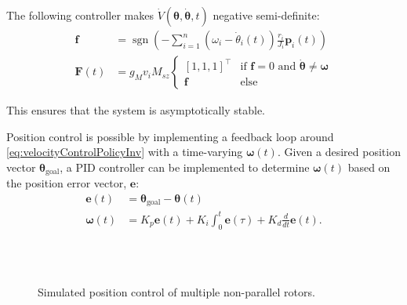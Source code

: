 \documentclass[graybox,usenames]{svmult}
\DeclareMathOperator{\sgn}{sgn}
\begin{document}
The following controller makes $ \dot{V}(\bm{\theta},\dot{\bm{\theta}},t) $ negative semi-definite:
\begin{align}
\mathbf{f} & = \sgn\!\left(  -\sum_{i=1}^n \left(  \omega_i - \dot{\theta}_i(t) \right) \frac{r_i}{J_i}  \mathbf{p}_i(t)    \right)\nonumber\\
\mathbf{F}(t) &=g_{M}v_i M_{sz}\begin{cases} [1,1,1]^\intercal &\mbox{if } \mathbf{f} = 0 \mbox{ and } \dot{\bm{\theta}} \ne \bm{\omega} \\ 
					       \mathbf{f} & \mbox{else } \end{cases}
					       \label{eq:velocityControlPolicyInv}
   \end{align}

This ensures that the system is asymptotically stable.

Position control is possible by implementing a feedback loop around \eqref{eq:velocityControlPolicyInv} with a time-varying $\bm{\omega}(t)$.  Given a desired position vector $\bm{\theta}_{\textrm{goal}}$, a PID controller can be implemented to determine $\bm{\omega}(t)$ based on the position error vector, $\mathbf{e}$:
   \begin{align}
\bm{e}(t) &=\bm{\theta}_{\textrm{goal}} - \bm{\theta}(t)\nonumber \\
\bm{\omega}(t) &= K_{p}  \bm{e}(t) + K_i\int_0^t \bm{e}(\tau) + K_d \frac{d}{dt} \bm{e}(t).
\label{eq:positioncontrol}
   \end{align}

 \begin{figure*}
\vspace{-1.em}\\
\vspace{-1.2em}
\\
\caption{\label{fig:PositionControlSim}Simulated position control of multiple non-parallel rotors.  }
\vspace{-1.75em}
\end{figure*}
\end{document}
